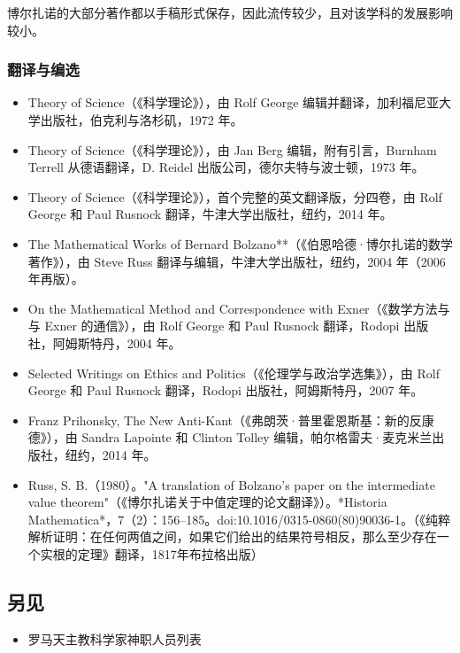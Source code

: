 博尔扎诺的大部分著作都以手稿形式保存，因此流传较少，且对该学科的发展影响较小。
\subsubsection{翻译与编选}
\begin{itemize}
\item Theory of Science（《科学理论》），由 Rolf George 编辑并翻译，加利福尼亚大学出版社，伯克利与洛杉矶，1972 年。  
\item Theory of Science（《科学理论》），由 Jan Berg 编辑，附有引言，Burnham Terrell 从德语翻译，D. Reidel 出版公司，德尔夫特与波士顿，1973 年。  
\item Theory of Science（《科学理论》），首个完整的英文翻译版，分四卷，由 Rolf George 和 Paul Rusnock 翻译，牛津大学出版社，纽约，2014 年。  
\item The Mathematical Works of Bernard Bolzano**（《伯恩哈德·博尔扎诺的数学著作》），由 Steve Russ 翻译与编辑，牛津大学出版社，纽约，2004 年（2006 年再版）。  
\item On the Mathematical Method and Correspondence with Exner（《数学方法与与 Exner 的通信》），由 Rolf George 和 Paul Rusnock 翻译，Rodopi 出版社，阿姆斯特丹，2004 年。  
\item Selected Writings on Ethics and Politics（《伦理学与政治学选集》），由 Rolf George 和 Paul Rusnock 翻译，Rodopi 出版社，阿姆斯特丹，2007 年。  
\item Franz Prihonsky, The New Anti-Kant（《弗朗茨·普里霍恩斯基：新的反康德》），由 Sandra Lapointe 和 Clinton Tolley 编辑，帕尔格雷夫·麦克米兰出版社，纽约，2014 年。  
\item Russ, S. B.（1980）。"A translation of Bolzano's paper on the intermediate value theorem"（《博尔扎诺关于中值定理的论文翻译》）。*Historia Mathematica*，7（2）：156–185。doi:10.1016/0315-0860(80)90036-1。（《纯粹解析证明：在任何两值之间，如果它们给出的结果符号相反，那么至少存在一个实根的定理》翻译，1817年布拉格出版）
\end{itemize}
\subsection{另见}  
\begin{itemize}
\item 罗马天主教科学家神职人员列表
\end{itemize}
